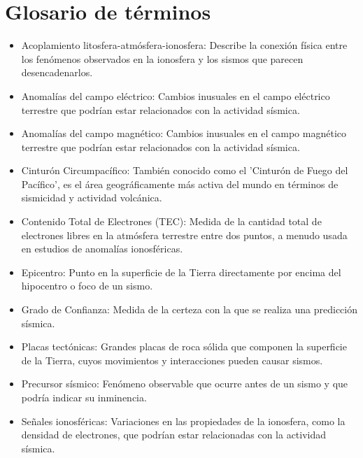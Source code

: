 \section{Glosario de términos}
\begin{itemize}

    \item Acoplamiento litosfera-atmósfera-ionosfera: Describe la conexión física entre los fenómenos observados en la ionosfera y los sismos que parecen desencadenarlos.

    \item Anomalías del campo eléctrico: Cambios inusuales en el campo eléctrico terrestre que podrían estar relacionados con la actividad sísmica.
    
    \item Anomalías del campo magnético: Cambios inusuales en el campo magnético terrestre que podrían estar relacionados con la actividad sísmica.
    
    \item Cinturón Circumpacífico: También conocido como el 'Cinturón de Fuego del Pacífico', es el área geográficamente más activa del mundo en términos de sismicidad y actividad volcánica.
    
    \item Contenido Total de Electrones (TEC): Medida de la cantidad total de electrones libres en la atmósfera terrestre entre dos puntos, a menudo usada en estudios de anomalías ionosféricas.
    
    \item Epicentro: Punto en la superficie de la Tierra directamente por encima del hipocentro o foco de un sismo.

    \item Grado de Confianza: Medida de la certeza con la que se realiza una predicción sísmica.
    
    \item Placas tectónicas: Grandes placas de roca sólida que componen la superficie de la Tierra, cuyos movimientos y interacciones pueden causar sismos.
    
    \item Precursor sísmico: Fenómeno observable que ocurre antes de un sismo y que podría indicar su inminencia.

    \item Señales ionosféricas: Variaciones en las propiedades de la ionosfera, como la densidad de electrones, que podrían estar relacionadas con la actividad sísmica.


\end{itemize}
